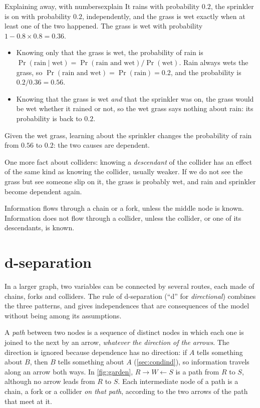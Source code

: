 \begin{example}{Explaining away, with numbers}{explain}
It rains with probability $0.2$, the sprinkler is on with probability
$0.2$, independently, and the grass is wet exactly when at least one of
the two happened. The grass is wet with probability $1-0.8\times0.8=0.36$.
\begin{itemize}[nosep]
  \item Knowing only that the grass is wet, the probability of rain is
    $\Pr(\text{rain}\mid\text{wet})=\Pr(\text{rain and wet})/\Pr(\text{wet})$.
    Rain always wets the grass, so $\Pr(\text{rain and wet})=
    \Pr(\text{rain})=0.2$, and the probability is $0.2/0.36=0.56$.
  \item Knowing that the grass is wet \emph{and} that the sprinkler was on,
    the grass would be wet whether it rained or not, so the wet grass says
    nothing about rain: its probability is back to $0.2$.
\end{itemize}
Given the wet grass, learning about the sprinkler changes the probability
of rain from $0.56$ to $0.2$: the two causes are dependent.
\end{example}

One more fact about colliders: knowing a \emph{descendant} of the collider
has an effect of the same kind as knowing the collider, usually weaker. If we do not see the grass
but see someone slip on it, the grass is probably wet, and rain and
sprinkler become dependent again.

\begin{inwords}
Information flows through a chain or a fork, unless the middle node is
known. Information does not flow through a collider, unless the collider,
or one of its descendants, is known.
\end{inwords}

\section{d-separation}
\label{sec:dsep}

In a larger graph, two variables can be connected by several routes, each
made of chains, forks and colliders. The rule of d-separation (``d'' for
\emph{directional}) combines the three patterns, and gives independences
that are consequences of the model without being among its assumptions.

A \emph{path} between two nodes is a sequence of distinct nodes in which
each one is joined to the next by an arrow, \emph{whatever the direction
of the arrows}. The direction is ignored because dependence has no direction: if
$A$ tells something about $B$, then $B$ tells something about $A$
(\cref{sec:condind}), so information travels along an arrow both ways. In
\cref{fig:garden}, $R\rightarrow W\leftarrow S$ is a path from
$R$ to $S$, although no arrow leads from $R$ to $S$. Each intermediate node
of a path is a chain, a fork or a collider \emph{on that path}, according
to the two arrows of the path that meet at it.

